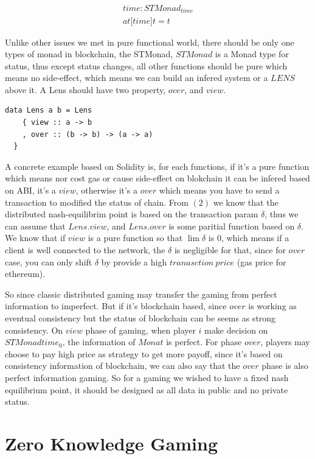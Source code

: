 \documentclass[twocolumn]{article}
\begin{document}
\begin{gather}
  time: STMonad_{time}\\
  at \mathbb{[} time \mathbb{]}t = t
\end{gather}

Unlike other issues we met in pure functional world, there should be only one types of monad in blockchain, the STMonad, $STMonad$ is a Monad type for status, thus except status changes, all other functions should be pure which means no side-effect, which means we can build an infered system or a $LENS$\cite {lens} above it. A Lens should have two property, $over$, and $view$. 

\lstset{language=Haskell}
\begin{lstlisting}
data Lens a b = Lens
    { view :: a -> b
    , over :: (b -> b) -> (a -> a)
  }
\end{lstlisting}

A concrete example based on Solidity is, for each functions, if it's a pure function which means nor cost gas or cause side-effect on blokchain it can be infered based on ABI, it's a $view$, otherwise it's a $over$ which means you have to send a transaction to modified the status of chain. From $(2)$ we know that the distributed nash-equilibrim point is based on the transaction param $\delta$, thus we can assume that $Lens.view$, and $Lens.over$ is some paritial function based on $\delta$. We know that if $view$ is a pure function so that $\lim \delta$ is 0, which means if a client is well connected to the network, the $\delta$ is negligible for that, since for $over$ case, you can only shift $\delta$ by provide a high $tranasction\ price$ (gas price for ethereum).


So since classic distributed gaming may transfer the gaming from perfect information to imperfect. But if it's blockchain based, since $over$ is working as eventual consistency\cite{consis} but the status of blockchain can be seems as strong consistency\cite {Consistent}. On $view$ phase of gaming, when player $i$ make decision on $STMonad time_0$, the information of $Monat$ is perfect. For phase $over$, players may choose to pay high price as strategy to get more payoff, since it's based on consistency information of blockchain, we can also say that the $over$ phase is also perfect information gaming. So for a gaming we wished to have a fixed nash equilibrium point, it should be designed as all data in public and no private status.

\section {Zero Knowledge Gaming}
\end{document}
